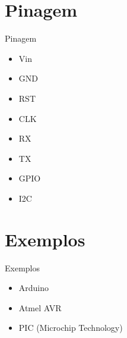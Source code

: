\documentclass[t]{beamer}
\begin{document}
\section{Pinagem}

\begin{frame}{Pinagem}
\begin{itemize}
	\item Vin
	\item GND
	\item RST
	\item CLK
	\item RX
	\item TX
	\item GPIO
	\item I2C
\end{itemize}
\end{frame}

\section{Exemplos}

\begin{frame}{Exemplos}
\begin{itemize}
	\item Arduino
	\item Atmel AVR
	\item PIC (Microchip Technology)
\end{itemize}

\end{frame}


\frame{\titlepage}
\end{document}
